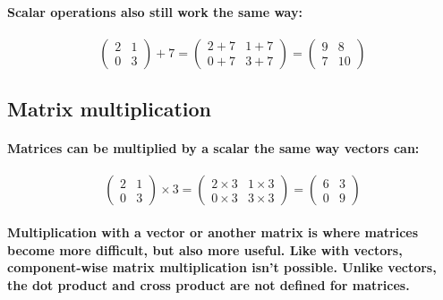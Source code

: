 \paragraph{
    Scalar operations also still work the same way:
}

\paragraph{
    \begin{equation*}
    \begin{pmatrix}
    2 & 1\\
    0 & 3
    \end{pmatrix} +7=\begin{pmatrix}
    2+7 & 1+7\\
    0+7 & 3+7
    \end{pmatrix} =\begin{pmatrix}
    9 & 8\\
    7 & 10
    \end{pmatrix}
    \end{equation*}
}

\subsection{\textsf{Matrix multiplication}}
\paragraph{
    Matrices can be multiplied by a scalar the same way vectors can:
}

\paragraph{
    \begin{equation*}
    \begin{pmatrix}
    2 & 1\\
    0 & 3
    \end{pmatrix} \times 3=\begin{pmatrix}
    2\times 3 & 1\times 3\\
    0\times 3 & 3\times 3
    \end{pmatrix} =\begin{pmatrix}
    6 & 3\\
    0 & 9
    \end{pmatrix}
    \end{equation*}
}

\paragraph{
    Multiplication with a vector or another matrix is where matrices become more difficult, but also more useful. Like with vectors, component-wise matrix multiplication isn't possible. Unlike vectors, the dot product and cross product are not defined for matrices.
}